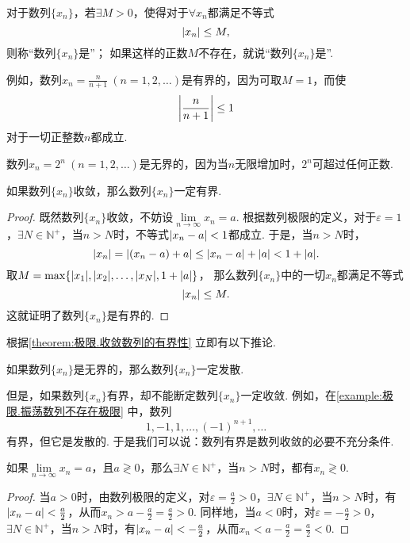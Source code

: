 \begin{definition}[数列的有界性]
对于数列\(\{x_n\}\)，若\(\exists M > 0\)，使得对于\(\forall x_n\)都满足不等式\[
\abs{x_n} \leq M,
\]则称“数列\(\{x_n\}\)是”；
如果这样的正数\(M\)不存在，就说“数列\(\{x_n\}\)是”.
\end{definition}
例如，数列\(x_n = \frac{n}{n+1}\ (n=1,2,\dotsc)\)是有界的，因为可取\(M=1\)，而使\[
\abs{\frac{n}{n+1}} \leq 1
\]对于一切正整数\(n\)都成立.

数列\(x_n = 2^n\ (n=1,2,\dotsc)\)是无界的，因为当\(n\)无限增加时，\(2^n\)可超过任何正数.

\begin{theorem}[收敛数列的有界性]\label{theorem:极限.收敛数列的有界性}
如果数列\(\{x_n\}\)收敛，那么数列\(\{x_n\}\)一定有界.
\begin{proof}
既然数列\(\{x_n\}\)收敛，不妨设\(\lim\limits_{n\to\infty}x_n = a\).
根据数列极限的定义，对于\(\varepsilon = 1\)，\(\exists N \in \mathbb{N}^+\)，当\(n > N\)时，不等式\(\abs{x_n - a} < 1\)都成立.
于是，当\(n > N\)时，\[
\abs{x_n} = \abs{(x_n - a) + a} \leq \abs{x_n - a} + \abs{a} < 1 + \abs{a}.
\]
取\(M = \max\{\abs{x_1},\abs{x_2},\dotsc,\abs{x_N},1+\abs{a}\}\)，
那么数列\(\{x_n\}\)中的一切\(x_n\)都满足不等式\[
\abs{x_n} \leq M.
\]
这就证明了数列\(\{x_n\}\)是有界的.
\end{proof}
\end{theorem}

根据\cref{theorem:极限.收敛数列的有界性} 立即有以下推论.
\begin{corollary}
如果数列\(\{x_n\}\)是无界的，那么数列\(\{x_n\}\)一定发散.
\end{corollary}
但是，如果数列\(\{x_n\}\)有界，却不能断定数列\(\{x_n\}\)一定收敛.
例如，在\cref{example:极限.振荡数列不存在极限} 中，数列\[
1,-1,1,\dotsc,(-1)^{n+1},\dotsc
\]有界，但它是发散的.
于是我们可以说：数列有界是数列收敛的必要不充分条件.

\begin{theorem}[收敛数列的保号性]\label{theorem:极限.收敛数列的保号性}
如果\(\lim\limits_{n\to\infty}x_n = a\)，且\(a \gtrless 0\)，那么\(\exists N \in \mathbb{N}^+\)，当\(n > N\)时，都有\(x_n \gtrless 0\).
\begin{proof}
当\(a > 0\)时，由数列极限的定义，对\(\varepsilon = \frac{a}{2} > 0\)，\(\exists N \in \mathbb{N}^+\)，当\(n > N\)时，有\(\abs{x_n - a} < \frac{a}{2}\)，从而\(x_n > a - \frac{a}{2} = \frac{a}{2} > 0\).
同样地，当\(a < 0\)时，对\(\varepsilon = -\frac{a}{2} > 0\)，\(\exists N \in \mathbb{N}^+\)，当\(n > N\)时，有\(\abs{x_n - a} < -\frac{a}{2}\)，从而\(x_n < a - \frac{a}{2} = \frac{a}{2} < 0\).
\end{proof}
\end{theorem}


